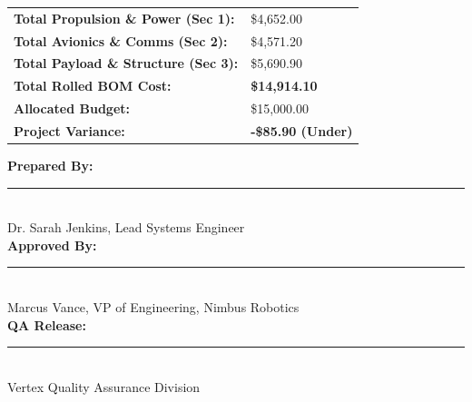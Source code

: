 \documentclass[10pt,letterpaper]{article}
\renewcommand{\arraystretch}{1.25}
\begin{document}
\vspace{25pt}

\noindent
\begin{minipage}[t]{0.48\textwidth}
  \begin{tcolorbox}[colback=lightBg, colframe=primaryColor, arc=2mm, boxrule=1pt, title=\textbf{Financial Roll-up Summary}, coltitle=white, fonttitle=\small\bfseries]
    \small
    \renewcommand{\arraystretch}{1.3}
    \begin{tabular}{@{}ll@{}}
      \textbf{Total Propulsion \& Power (Sec 1):} & \$4,652.00 \\
      \textbf{Total Avionics \& Comms (Sec 2):} & \$4,571.20 \\
      \textbf{Total Payload \& Structure (Sec 3):} & \$5,690.90 \\
      \midrule
      \textbf{Total Rolled BOM Cost:} & \textbf{\$14,914.10} \\
      \textbf{Allocated Budget:} & \$15,000.00 \\
      \textbf{Project Variance:} & \textcolor{accentColor}{\textbf{-\$85.90 (Under)}}
    \end{tabular}
  \end{tcolorbox}
\end{minipage}
\hfill
\begin{minipage}[t]{0.48\textwidth}
  \begin{tcolorbox}[colback=white, colframe=borderGray, arc=2mm, boxrule=1pt, title=\textbf{Approval \& Release Status}, coltitle=primaryColor, fonttitle=\small\bfseries]
    \small
    \vspace{5pt}
    \textbf{Prepared By:} \\
    \rule{0.9\textwidth}{0.5pt} \\
    Dr. Sarah Jenkins, Lead Systems Engineer \\[12pt]
    \textbf{Approved By:} \\
    \rule{0.9\textwidth}{0.5pt} \\
    Marcus Vance, VP of Engineering, Nimbus Robotics \\[12pt]
    \textbf{QA Release:} \\
    \rule{0.9\textwidth}{0.5pt} \\
    Vertex Quality Assurance Division
  \end{tcolorbox}
\end{minipage}
\par
\end{document}
